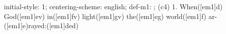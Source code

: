 initial-style: 1;
centering-scheme: english;
def-m1: \grealign;
(c4) 1. When([em1]d) God([em1]ev) in([em1]fv) light([em1]gv) the([em1]eg) world([em1]f) ar-([em1]e)rayed:([em1]ded)